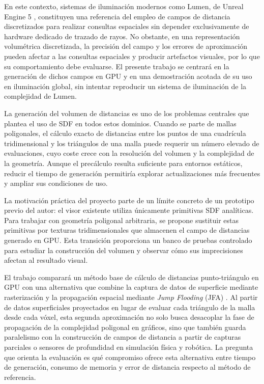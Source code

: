 En este contexto, sistemas de iluminación modernos como Lumen, de Unreal Engine 5 \cite{wright2022}, constituyen una referencia del empleo de campos de distancia discretizados para realizar consultas espaciales sin depender exclusivamente de hardware dedicado de trazado de rayos. No obstante, en una representación volumétrica discretizada, la precisión del campo y los errores de aproximación pueden afectar a las consultas espaciales y producir artefactos visuales, por lo que su comportamiento debe evaluarse. El presente trabajo se centrará en la generación de dichos campos en GPU y en una demostración acotada de su uso en iluminación global, sin intentar reproducir un sistema de iluminación de la complejidad de Lumen.

La generación del volumen de distancias es uno de los problemas centrales que plantea el uso de SDF en todos estos dominios. Cuando se parte de mallas poligonales, el cálculo exacto de distancias entre los puntos de una cuadrícula tridimensional y los triángulos de una malla puede requerir un número elevado de evaluaciones, cuyo coste crece con la resolución del volumen y la complejidad de la geometría. Aunque el precálculo resulta suficiente para entornos estáticos, reducir el tiempo de generación permitiría explorar actualizaciones más frecuentes y ampliar sus condiciones de uso.

La motivación práctica del proyecto parte de un límite concreto de un prototipo previo del autor: el visor existente utiliza únicamente primitivas SDF analíticas. Para trabajar con geometría poligonal arbitraria, se propone sustituir estas primitivas por texturas tridimensionales que almacenen el campo de distancias generado en GPU. Esta transición proporciona un banco de pruebas controlado para estudiar la construcción del volumen y observar cómo sus imprecisiones afectan al resultado visual.

El trabajo comparará un método base de cálculo de distancias punto-triángulo en GPU con una alternativa que combine la captura de datos de superficie mediante rasterización y la propagación espacial mediante \textit{Jump Flooding} (JFA) \cite{rong2006}. Al partir de datos superficiales proyectados en lugar de evaluar cada triángulo de la malla desde cada vóxel, esta segunda aproximación no solo busca desacoplar la fase de propagación de la complejidad poligonal en gráficos, sino que también guarda paralelismo con la construcción de campos de distancia a partir de capturas parciales o sensores de profundidad en simulación física y robótica. La pregunta que orienta la evaluación es qué compromiso ofrece esta alternativa entre tiempo de generación, consumo de memoria y error de distancia respecto al método de referencia.

